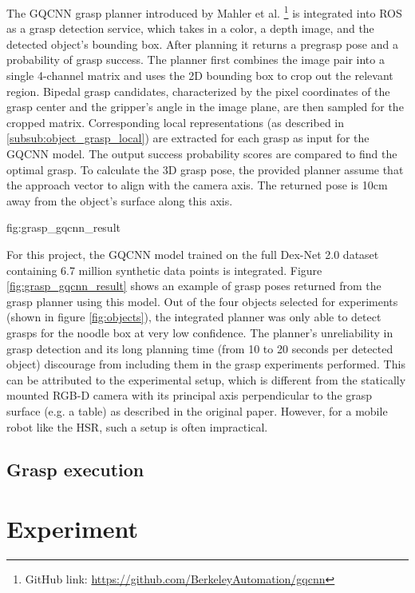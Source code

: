 The GQCNN grasp planner introduced by Mahler et al. \footnote{GitHub link:
\url{https://github.com/BerkeleyAutomation/gqcnn}} \cite{mahler2017} is integrated into ROS as a grasp detection
service, which takes in a color, a depth image, and the detected object's bounding box. After planning it returns a
pregrasp pose and a probability of grasp success. The planner first combines the image pair into a single 4-channel
matrix and uses the 2D bounding box to crop out the relevant region. Bipedal grasp candidates, characterized by the
pixel coordinates of the grasp center and the gripper's angle in the image plane, are then sampled for the cropped
matrix. Corresponding local representations (as described in \ref{subsub:object_grasp_local}) are extracted for each
grasp as input for the GQCNN model. The output success probability scores are compared to find the optimal grasp. To
calculate the 3D grasp pose, the provided planner assume that the approach vector to align with the camera axis. The
returned pose is 10cm away from the object's surface along this axis.

             {fig:grasp_gqcnn_result}{\textwidth}

For this project, the GQCNN model trained on the full Dex-Net 2.0 dataset containing 6.7 million synthetic data points
\cite{mahler2017} is integrated. Figure \ref{fig:grasp_gqcnn_result} shows an example of grasp poses returned from the
grasp planner using this model. Out of the four objects selected for experiments (shown in figure \ref{fig:objects}),
the integrated planner was only able to detect grasps for the noodle box at very low confidence. The planner's
unreliability in grasp detection and its long planning time (from 10 to 20 seconds per detected object) discourage from
including them in the grasp experiments performed. This can be attributed to the experimental setup, which is different
from the statically mounted RGB-D camera with its principal axis perpendicular to the grasp surface (e.g. a table) as
described in the original paper. However, for a mobile robot like the HSR, such a setup is often impractical.

\subsection{Grasp execution}

\pagebreak
\section{Experiment}


